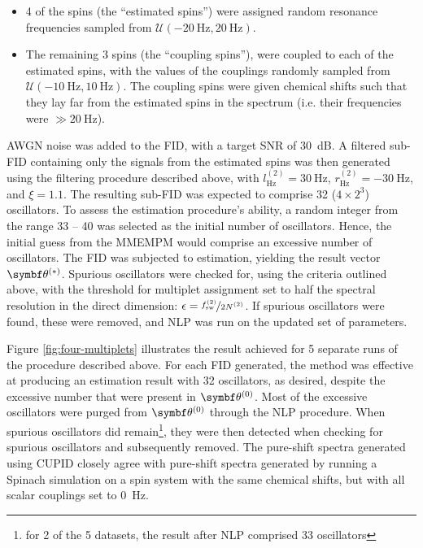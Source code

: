 \begin{itemize}
    \item 4 of the spins (the ``estimated spins'') were assigned random
        resonance frequencies sampled from $\mathcal{U}(\qty{-20}{\hertz},
        \qty{20}{\hertz})$.
    \item The remaining 3 spins (the ``coupling spins''), were coupled to each
        of the estimated spins, with the values of the couplings randomly
        sampled from $\mathcal{U}(\qty{-10}{\hertz}, \qty{10}{\hertz})$.  The
        coupling spins were given chemical shifts such that they lay far from
        the estimated spins in the spectrum (i.e. their frequencies were $\gg
        \qty{20}{\hertz}$).
\end{itemize}
\ac{AWGN} noise was added to the \ac{FID}, with a target \ac{SNR} of \qty{30}{\deci\bel}.
A filtered sub-\ac{FID} containing only the signals from the estimated spins
was then generated using the filtering procedure described above, with
$l^{(2)}_{\unit{\hertz}} = \qty{30}{\hertz}$,
$r^{(2)}_{\unit{\hertz}} = \qty{-30}{\hertz}$, and
$\xi = 1.1$. The resulting sub-\ac{FID} was expected to comprise 32 ($4 \times
2^3$) oscillators. To assess the estimation procedure's ability, a random
integer from the range 33 -- 40 was selected as the initial number of
oscillators. Hence, the initial guess from the \ac{MMEMPM} would comprise an
excessive number of oscillators. The \ac{FID} was subjected to
estimation, yielding the result vector $\bthstar$. Spurious oscillators were
checked for, using the criteria outlined above, with the threshold for
multiplet assignment set to half the spectral resolution in the direct
dimension:
$\epsilon = \nicefrac{f_{\text{sw}}^{(2)}}{2N^{(2)}}$.  If spurious oscillators
were found, these were removed, and \ac{NLP} was run on the updated set of
parameters.

Figure \ref{fig:four-multiplets} illustrates the result achieved for 5 separate
runs of the procedure described above.
For each \ac{FID} generated, the method was effective at producing an
estimation result with 32 oscillators, as desired, despite the excessive number
that were present in $\bthzero$. Most of the excessive oscillators were purged
from $\bthzero$ through the \ac{NLP} procedure. When spurious oscillators did
remain\footnote{for 2 of the 5 datasets, the result after \ac{NLP} comprised 33
oscillators}, they were then detected when checking for spurious oscillators
and subsequently removed. The pure-shift spectra generated using \ac{CUPID}
closely agree with pure-shift spectra generated by running a Spinach simulation
on a spin system with the same chemical shifts, but with all scalar couplings
set to \qty{0}{\hertz}.

